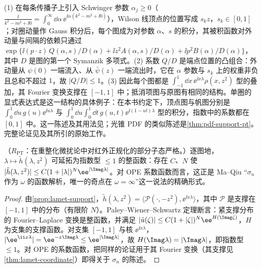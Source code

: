 \begin{proofsketch}
(1) 在每条传播子上引入 Schwinger 参数 $\alpha_j\ge0$（$\frac{\ii}{k^2-m^2+\ii0}=\int_0^\infty\dd\alpha\,\ee^{\ii\alpha(k^2-m^2+\ii0)}$），Wilson 线顶点的位置写成 $s_kz$，$s_k\in[0,1]$；对圈动量作 Gauss 积分后，每个图成为对参数 $\alpha$、$s$ 的积分，其被积函数对外动量与间隔的依赖只通过 $\exp\{\ii(p\cdot z)\,Q(\alpha,s)/D(\alpha)+\ii z^2A(\alpha,s)/D(\alpha)+\ii p^2B(\alpha)/D(\alpha)\}$，其中 $D$ 是图的第一个 Symanzik 多项式。(2) 系数 $Q/D$ 是端点位置的凸组合：外动量从 $\psi(0)$ 一端流入、从 $\bar\psi(z)$ 一端流出时，它在 $\alpha$ 参数与 $s_k$ 上的权重非负且总和不超过 $1$，故 $|Q/D|\le1$。(3) 因此每个图都是 $\int_{-1}^1\dd x\,\ee^{\ii x\lambda}\rho(x,z^2)$ 型的叠加，其 Fourier 变换支撑在 $[-1,1]$ 中；抵消项图与原图有相同的结构。单圈的显式表达式是这一结构的具体例子：在本书约定下，顶点图与帆图分别是 $\int_0^1\dd u\,g(u)\ee^{\ii u\lambda}$ 与 $\int_0^1\dd u\int_0^1\dd t\,g(u,t)\ee^{\ii(1-ut)\lambda}$ 型的积分\cite[第~III~节]{IzubuchiEtAl2018}，指数中的系数都在 $[0,1]$ 中。这一陈述及其用法见\cite{Radyushkin2017,Radyushkin:2018cvn,IzubuchiEtAl2018}；光锥 PDF 的类似陈述是\cref{thm:pdf-support-pt}。完整论证见\cite{Radyushkin2017}及其所引的原始工作。
\end{proofsketch}

\begin{corollary}\label{cor:lamet-entire}
（$R_{\mathrm{PT}}$：在重整化微扰论中对红外正规化的部分子态严格。）逐图地，$\lambda\mapsto\tilde h(\lambda,z^2)$ 可延拓为指数型 $\le1$ 的整函数：存在 $C$、$N$ 使 $|\tilde h(\lambda,z^2)|\le C(1+|\lambda|)^N\ee^{|\Imag\lambda|}$。对 OPE 系数函数而言，这正是 Ma--Qiu “$\sigma_n$ 作为 $\omega$ 的函数解析，唯一的奇点在 $\omega=\infty$”\cite{MaQiu2018}这一说法的精确形式。
\end{corollary}

\begin{proof}
由\cref{prop:lamet-support}，$\tilde h(\lambda,z^2)=\langle\mathcal P(\cdot,-z^2),\ee^{\ii x\lambda}\rangle$，其中 $\mathcal P$ 是支撑在 $[-1,1]$ 中的分布（有限阶 $N$）。Paley--Wiener--Schwartz 定理\cite[定理~7.3.1]{Hormander2003}断言：紧支撑分布的 Fourier--Laplace 变换是整函数，并满足 $|\hat u(\zeta)|\le C(1+|\zeta|)^N\ee^{H(\Imag\zeta)}$，$H$ 为支集的支撑函数。对支集 $[-1,1]$ 与核 $\ee^{\ii x\lambda}$，$|\ee^{\ii x\lambda}|=\ee^{-x\Imag\lambda}\le\ee^{|\Imag\lambda|}$，故 $H(\Imag\lambda)=|\Imag\lambda|$，即指数型 $\le1$。对 OPE 的系数函数，把同样的论证用于其 Fourier 变换（其支撑见\cref{thm:lamet-coordinate}）即得关于 $\sigma_n$ 的陈述。
\end{proof}

